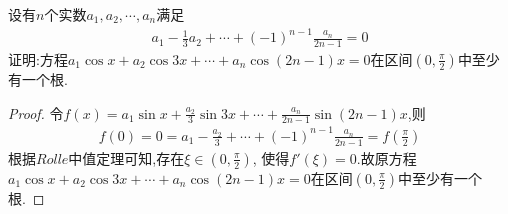 \documentclass[lang=cn,newtx,10pt,scheme=chinese]{../Template/elegantbook}
\begin{document}
\begin{exercise}
    设有\(n\)个实数\(a_1,a_2,\cdots,a_n\)满足
    \begin{gather}
        a_{1}-\frac{1}{3}a_{2}+\cdots+(-1)^{n - 1}\frac{a_{n}}{2n - 1}=0
    \nonumber
    \end{gather}
    证明:方程\(a_1\cos x + a_2\cos3x+\cdots+a_n\cos(2n - 1)x = 0\)在区间\((0,\frac{\pi}{2})\)中至少有一个根.
\end{exercise}
    \begin{proof}
        令$f\left( x \right) =a_1\sin x+\frac{a_2}{3}\sin 3x+\cdots +\frac{a_n}{2n-1}\sin \left( 2n-1 \right) x$,则
        \begin{gather}
            f\left( 0 \right) =0=a_1-\frac{a_2}{3}+\cdots +\left( -1 \right) ^{n-1}\frac{a_n}{2n-1}=f\left( \frac{\pi}{2} \right) 
            \nonumber
        \end{gather}
        根据$Rolle$中值定理可知,存在$\xi\in(0,\frac{\pi}{2})$,
        使得$f'(\xi)=0$.故原方程\(a_1\cos x + a_2\cos3x+\cdots+a_n\cos(2n - 1)x = 0\)在区间\((0,\frac{\pi}{2})\)中至少有一个根.
    
\end{proof}
\end{document}
